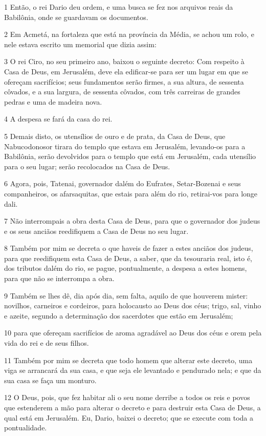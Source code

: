 \par 1 Então, o rei Dario deu ordem, e uma busca se fez nos arquivos reais da Babilônia, onde se guardavam os documentos.
\par 2 Em Acmetá, na fortaleza que está na província da Média, se achou um rolo, e nele estava escrito um memorial que dizia assim:
\par 3 O rei Ciro, no seu primeiro ano, baixou o seguinte decreto: Com respeito à Casa de Deus, em Jerusalém, deve ela edificar-se para ser um lugar em que se ofereçam sacrifícios; seus fundamentos serão firmes, a sua altura, de sessenta côvados, e a sua largura, de sessenta côvados, com três carreiras de grandes pedras e uma de madeira nova.
\par 4 A despesa se fará da casa do rei.
\par 5 Demais disto, os utensílios de ouro e de prata, da Casa de Deus, que Nabucodonosor tirara do templo que estava em Jerusalém, levando-os para a Babilônia, serão devolvidos para o templo que está em Jerusalém, cada utensílio para o seu lugar; serão recolocados na Casa de Deus.
\par 6 Agora, pois, Tatenai, governador dalém do Eufrates, Setar-Bozenai e seus companheiros, os afarsaquitas, que estais para além do rio, retirai-vos para longe dali.
\par 7 Não interrompais a obra desta Casa de Deus, para que o governador dos judeus e os seus anciãos reedifiquem a Casa de Deus no seu lugar.
\par 8 Também por mim se decreta o que haveis de fazer a estes anciãos dos judeus, para que reedifiquem esta Casa de Deus, a saber, que da tesouraria real, isto é, dos tributos dalém do rio, se pague, pontualmente, a despesa a estes homens, para que não se interrompa a obra.
\par 9 Também se lhes dê, dia após dia, sem falta, aquilo de que houverem mister: novilhos, carneiros e cordeiros, para holocausto ao Deus dos céus; trigo, sal, vinho e azeite, segundo a determinação dos sacerdotes que estão em Jerusalém;
\par 10 para que ofereçam sacrifícios de aroma agradável ao Deus dos céus e orem pela vida do rei e de seus filhos.
\par 11 Também por mim se decreta que todo homem que alterar este decreto, uma viga se arrancará da sua casa, e que seja ele levantado e pendurado nela; e que da sua casa se faça um monturo.
\par 12 O Deus, pois, que fez habitar ali o seu nome derribe a todos os reis e povos que estenderem a mão para alterar o decreto e para destruir esta Casa de Deus, a qual está em Jerusalém. Eu, Dario, baixei o decreto; que se execute com toda a pontualidade.
